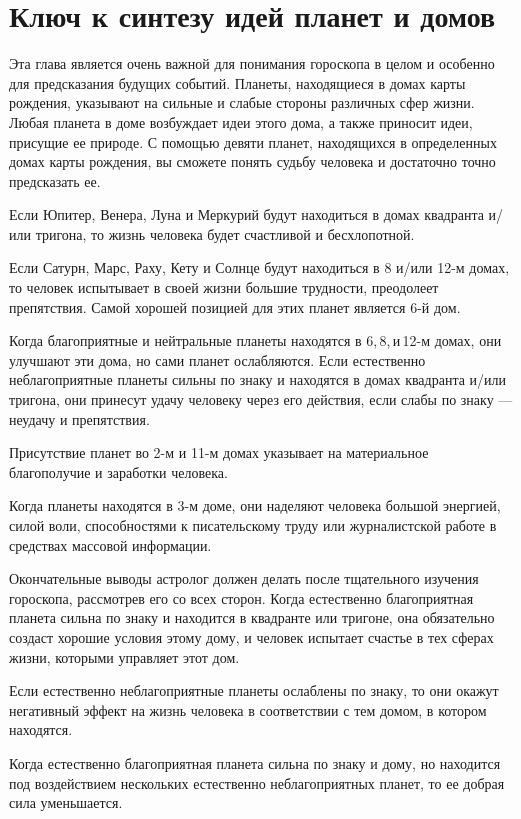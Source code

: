 \section{Ключ к синтезу идей планет и домов}

Эта глава является очень важной для понимания гороскопа в целом и особенно для предсказания будущих событий. Планеты, находящиеся в домах карты рождения, указывают на сильные и слабые стороны различных сфер жизни. Любая планета в доме возбуждает идеи этого дома, а также приносит идеи, присущие ее природе. С помощью девяти планет, находящихся в определенных домах карты рождения, вы сможете понять судьбу человека  и достаточно точно предсказать ее.

Если Юпитер, Венера, Луна и Меркурий будут находиться в домах квадранта и/или тригона, то жизнь человека будет счастливой и бесхлопотной.

Если Сатурн, Марс, Раху, Кету и Солнце будут находиться в 8 и/или 12-м домах, то человек испытывает в своей жизни большие трудности, преодолеет препятствия. Самой хорошей позицией для этих планет является 6-й дом.

Когда благоприятные и нейтральные планеты находятся в 6,\,8,\,и\,12-м домах, они улучшают эти дома, но сами планет ослабляются. Если естественно неблагоприятные планеты сильны по знаку и находятся в домах квадранта и/или тригона, они принесут удачу человеку через его действия, если слабы по знаку --- неудачу и препятствия.

Присутствие планет во 2-м и 11-м домах указывает на материальное благополучие и заработки человека.

Когда планеты находятся в 3-м доме, они наделяют человека большой энергией, силой воли, способностями к писательскому труду или журналистской работе в средствах массовой информации.

Окончательные выводы астролог должен делать после тщательного изучения гороскопа, рассмотрев его со всех сторон. Когда естественно благоприятная планета сильна по знаку и находится в квадранте или тригоне, она обязательно создаст хорошие условия этому дому, и человек испытает счастье в тех сферах жизни, которыми управляет этот дом.

Если естественно неблагоприятные планеты ослаблены по знаку, то они окажут негативный эффект на жизнь человека в соответствии с тем домом, в котором находятся.

Когда естественно благоприятная планета сильна по знаку и дому, но находится под воздействием нескольких естественно неблагоприятных планет, то ее добрая сила уменьшается.

